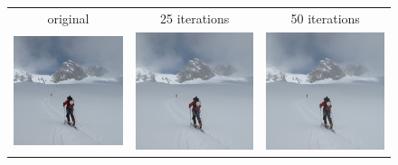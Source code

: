 \documentclass{article}
\begin{document}
\begin{figure}[h]
\centering
    \begin{tabular}{c c c}
        original & 25 iterations & 50 iterations \\
        \includegraphics[width=0.3\linewidth]{../test_images/skiers.jpg} & \includegraphics[width=0.3\linewidth]{../test_images/dispersion_reduced/skiers25.png} & \includegraphics[width=0.3\linewidth]{../test_images/dispersion_reduced/skiers50.png} \\


\end{tabular}
\end{figure}
\end{document}
